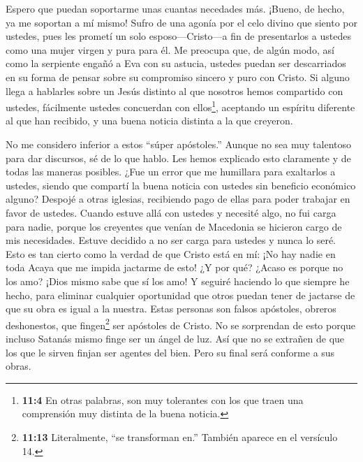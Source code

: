  Espero que puedan soportarme unas cuantas necedades más.
¡Bueno, de hecho, ya me soportan a mí mismo!  Sufro de una
agonía por el celo divino que siento por ustedes, pues les prometí un
solo esposo---Cristo---a fin de presentarlos a ustedes como una mujer
virgen y pura para él.  Me preocupa que, de algún modo, así
como la serpiente engañó a Eva con su astucia, ustedes puedan ser
descarriados en su forma de pensar sobre su compromiso sincero y puro
con Cristo.  Si alguno llega a hablarles sobre un Jesús
distinto al que nosotros hemos compartido con ustedes, fácilmente
ustedes concuerdan con ellos\footnote{\textbf{11:4} En otras palabras,
  son muy tolerantes con los que traen una comprensión muy distinta de
  la buena noticia.}, aceptando un espíritu diferente al que han
recibido, y una buena noticia distinta a la que creyeron.

 No me considero inferior a estos ``súper apóstoles.''
 Aunque no sea muy talentoso para dar discursos, sé de lo
que hablo. Les hemos explicado esto claramente y de todas las maneras
posibles.  ¿Fue un error que me humillara para exaltarlos a
ustedes, siendo que compartí la buena noticia con ustedes sin beneficio
económico alguno?  Despojé a otras iglesias, recibiendo pago
de ellas para poder trabajar en favor de ustedes.  Cuando
estuve allá con ustedes y necesité algo, no fui carga para nadie, porque
los creyentes que venían de Macedonia se hicieron cargo de mis
necesidades. Estuve decidido a no ser carga para ustedes y nunca lo
seré.  Esto es tan cierto como la verdad de que Cristo está
en mí: ¡No hay nadie en toda Acaya que me impida jactarme de esto!
 ¿Y por qué? ¿Acaso es porque no los amo? ¡Dios mismo sabe
que sí los amo!  Y seguiré haciendo lo que siempre he
hecho, para eliminar cualquier oportunidad que otros puedan tener de
jactarse de que su obra es igual a la nuestra.  Estas
personas son falsos apóstoles, obreros deshonestos, que
fingen\footnote{\textbf{11:13} Literalmente, ``se transforman en.''
  También aparece en el versículo 14.} ser apóstoles de Cristo.
 No se sorprendan de esto porque incluso Satanás mismo
finge ser un ángel de luz.  Así que no se extrañen de que
los que le sirven finjan ser agentes del bien. Pero su final será
conforme a sus obras.

